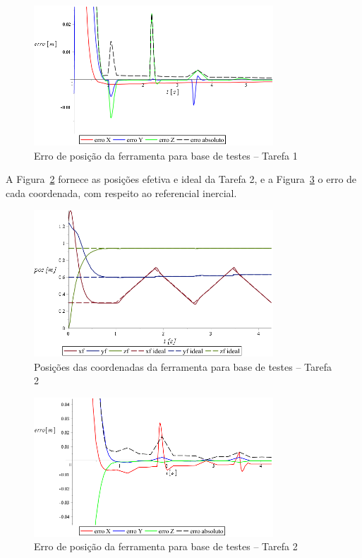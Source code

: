 \begin{figure}[h!]
	\centering 
 	\includegraphics[width=0.80\textwidth]{figs/t1_erroposf_base_testes}
 	\caption{Erro de posição da ferramenta para base de testes -- Tarefa 1}
 	\label{fig::t1_erroposf_base_testes}
\end{figure}

A Figura~\ref{fig::t2_posf_base_testes} fornece as posições efetiva e ideal da
Tarefa 2, e a Figura~\ref{fig::t2_erroposf_base_testes} o erro de cada
coordenada, com respeito ao referencial inercial.

\begin{figure}[h!]
	\centering 
 	\includegraphics[width=0.80\textwidth]{figs/t2_posf_base_testes}
 	\caption{Posições das coordenadas da ferramenta para base de testes -- Tarefa
 	2}
 	\label{fig::t2_posf_base_testes}
\end{figure}

\begin{figure}[h!]
	\centering 
 	\includegraphics[width=0.80\textwidth]{figs/t2_erroposf_base_testes}
 	\caption{Erro de posição da ferramenta para base de testes -- Tarefa 2}
 	\label{fig::t2_erroposf_base_testes}
\end{figure}



